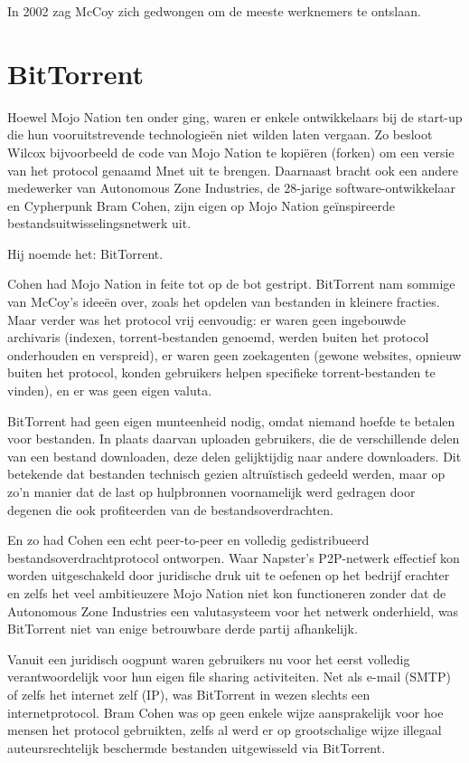 \documentclass[smalldemyvopaper,11pt,twoside,onecolumn,openright,extrafontsizes,hidelinks]{memoir}
\begin{document}
In 2002 zag McCoy zich gedwongen om de meeste werknemers te ontslaan.

\section{BitTorrent}\label{bittorrent}

Hoewel Mojo Nation ten onder ging, waren er enkele ontwikkelaars bij de
start-up die hun vooruitstrevende technologieën niet wilden laten
vergaan. Zo besloot Wilcox bijvoorbeeld de code van Mojo Nation te
kopiëren (forken) om een versie van het protocol genaamd Mnet uit te
brengen. Daarnaast bracht ook een andere medewerker van Autonomous Zone
Industries, de 28-jarige software-ontwikkelaar en Cypherpunk Bram Cohen,
zijn eigen op Mojo Nation geïnspireerde bestandsuitwisselingsnetwerk
uit.

Hij noemde het: BitTorrent.

Cohen had Mojo Nation in feite tot op de bot gestript. BitTorrent nam
sommige van McCoy's ideeën over, zoals het opdelen van bestanden in
kleinere fracties. Maar verder was het protocol vrij eenvoudig: er waren
geen ingebouwde archivaris (indexen, torrent-bestanden genoemd, werden
buiten het protocol onderhouden en verspreid), er waren geen zoekagenten
(gewone websites, opnieuw buiten het protocol, konden gebruikers helpen
specifieke torrent-bestanden te vinden), en er was geen eigen valuta.

BitTorrent had geen eigen munteenheid nodig, omdat niemand hoefde te
betalen voor bestanden. In plaats daarvan uploaden gebruikers, die de
verschillende delen van een bestand downloaden, deze delen gelijktijdig
naar andere downloaders. Dit betekende dat bestanden technisch gezien
altruïstisch gedeeld werden, maar op zo'n manier dat de last op
hulpbronnen voornamelijk werd gedragen door degenen die ook profiteerden
van de bestandsoverdrachten.

En zo had Cohen een echt peer-to-peer en volledig gedistribueerd
bestandsoverdrachtprotocol ontworpen. Waar Napster's P2P-netwerk
effectief kon worden uitgeschakeld door juridische druk uit te oefenen
op het bedrijf erachter en zelfs het veel ambitieuzere Mojo Nation niet
kon functioneren zonder dat de Autonomous Zone Industries een
valutasysteem voor het netwerk onderhield, was BitTorrent niet van enige
betrouwbare derde partij afhankelijk.

Vanuit een juridisch oogpunt waren gebruikers nu voor het eerst volledig
verantwoordelijk voor hun eigen file sharing activiteiten. Net als
e-mail (SMTP) of zelfs het internet zelf (IP), was BitTorrent in wezen
slechts een internetprotocol. Bram Cohen was op geen enkele wijze
aansprakelijk voor hoe mensen het protocol gebruikten, zelfs al werd er
op grootschalige wijze illegaal auteursrechtelijk beschermde bestanden
uitgewisseld via BitTorrent.
\end{document}
